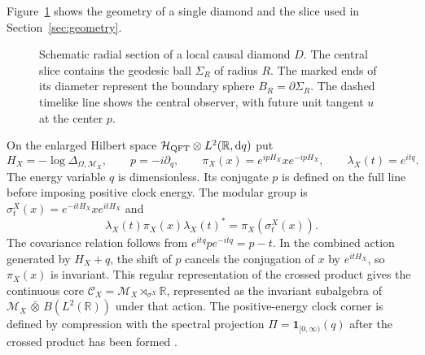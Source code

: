 \documentclass[11pt,a4paper]{article}
\numberwithin{equation}{section}
\theoremstyle{remark}
\newcommand{\M}{\mathcal M}
\newcommand{\Hh}{\mathcal H}
\newcommand{\R}{\mathbb R}
\newcommand{\Core}{\mathcal C}
\newcommand{\dd}{\mathrm d}
\newcommand{\one}{\mathbf 1}
\begin{document}
Figure~\ref{fig:diamond} shows the geometry of a single diamond and the slice used in Section~\ref{sec:geometry}.

\begin{figure}[htbp]
\centering
{}
\caption{Schematic radial section of a local causal diamond $D$. The central slice contains the geodesic ball $\Sigma_R$ of radius $R$. The marked ends of its diameter represent the boundary sphere $B_R=\partial\Sigma_R$. The dashed timelike line shows the central observer, with future unit tangent $u$ at the center $p$.}
\label{fig:diamond}
\end{figure}

On the enlarged Hilbert space $\Hh_{\rm QFT}\otimes L^2(\R,\dd q)$ put
\begin{equation}
 H_X=-\log\Delta_{\Omega,\M_X},\qquad p=-i\partial_q,\qquad
 \pi_X(x)=e^{ipH_X}x e^{-ipH_X},\qquad \lambda_X(t)=e^{itq}.
 \label{eq:dressing}
\end{equation}
The energy variable $q$ is dimensionless. Its conjugate $p$ is defined on the full line before imposing positive clock energy. The modular group is $\sigma_t^X(x)=e^{-itH_X}x e^{itH_X}$ and
\begin{equation}
 \lambda_X(t)\pi_X(x)\lambda_X(t)^*=\pi_X(\sigma_t^X(x)).
 \label{eq:covariance}
\end{equation}
The covariance relation follows from $e^{itq}p e^{-itq}=p-t$. In the combined action generated by $H_X+q$, the shift of $p$ cancels the conjugation of $x$ by $e^{itH_X}$, so $\pi_X(x)$ is invariant. This regular representation of the crossed product gives the continuous core
$\Core_X=\M_X\rtimes_{\sigma^X}\R$, represented as the invariant subalgebra of $\M_X\,\bar\otimes\,B(L^2(\R))$ under that action. The positive-energy clock corner is defined by compression with the spectral projection $\Pi=\one_{[0,\infty)}(q)$ after the crossed product has been formed \cite{Takesaki2003,Witten2022,CLPW2022}.
\end{document}
